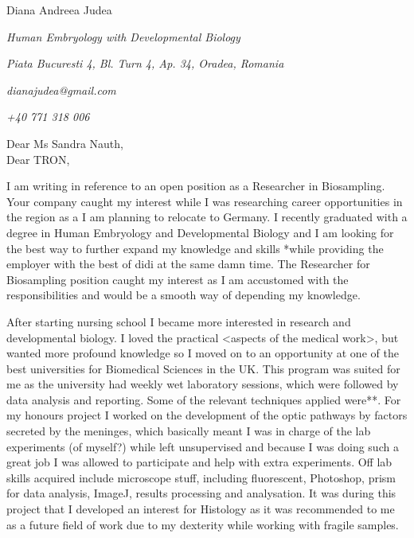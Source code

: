 \documentclass[paper=a4,fontsize=11pt]{scrartcl} %
\newcommand{\sepspace}{\vspace*{1em}}		%
\newcommand{\MyName}[1]{ %
  \Huge \usefont{OT1}{phv}{b}{n} \hfill #1
  \par \normalsize \normalfont}
\newcommand{\MyCoverSlogan}[4]{ %
  \large \usefont{OT1}{phv}{m}{n}\hfill \textit{#1} 
  \sepspace
  \par \normalsize \usefont{OT1}{phv}{m}{n}\hfill \textit{#2}
  \par \normalsize \usefont{OT1}{phv}{m}{n}\hfill \textit{#3}
  \par \normalsize \usefont{OT1}{phv}{m}{n}\hfill \textit{#4}
  \par \normalsize \normalfont}
\begin{document}
  
  \MyName{Diana Andreea Judea}
  \MyCoverSlogan{Human Embryology with Developmental Biology}{Piata Bucuresti 4, Bl. Turn 4, Ap. 34, Oradea, Romania}{dianajudea@gmail.com}{+40 771 318 006}
  \sepspace \sepspace
  
  \noindent
  Dear Ms Sandra Nauth, \\
  Dear TRON,

  \sepspace
  
  \noindent
  I am writing in reference to an open position as a Researcher in
  Biosampling.  Your company caught my interest while I was researching career
  opportunities in the region as a I am planning to relocate to Germany.  I
  recently graduated with a degree in Human Embryology and Developmental
  Biology and I am looking for the best way to further expand my knowledge and
  skills *while providing the employer with the best of didi at the same damn
  time.  The Researcher for Biosampling position caught my interest as I am
  accustomed with the responsibilities and would be a smooth way of depending
  my knowledge.
  \sepspace
  
  \noindent 
  After starting nursing school I became more interested in research and
  developmental biology.  I loved the practical <aspects of the medical work>,
  but wanted more profound knowledge so I moved on to an opportunity at one of the
  best universities for Biomedical Sciences in the UK.  This program was suited
  for me as the university had weekly wet laboratory sessions, which were
  followed by data analysis and reporting.  Some of the relevant techniques
  applied were**.  For my honours project I worked on the development of the
  optic pathways by factors secreted by the meninges, which basically meant I
  was in charge of the lab experiments (of myself?) while left unsupervised and
  because I was doing such a great job I was allowed to participate and help
  with extra experiments.  Off lab skills acquired include microscope stuff,
  including fluorescent, Photoshop, prism for data analysis, ImageJ, results
  processing and analysation.  It was during this project that I developed an
  interest for Histology as it was recommended to me as a future field of work
  due to my dexterity while working with fragile samples.
  \sepspace
\end{document}
